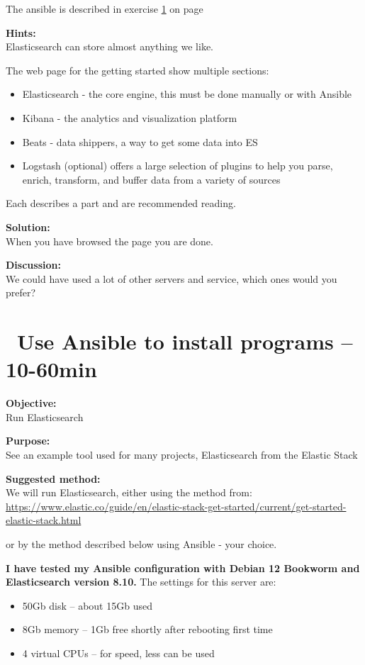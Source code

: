 \documentclass[a4paper,11pt,notitlepage]{report}
\begin{document}
The ansible is described in exercise \ref{ex:basicansible} on page \pageref{ex:basicansible}

{\bf Hints:}\\
Elasticsearch can store almost anything we like.

The web page for the getting started show multiple sections:
\begin{itemize}
\item Elasticsearch - the core engine, this must be done manually or with Ansible
\item Kibana - the analytics and visualization platform
\item Beats - data shippers, a way to get some data into ES
\item Logstash (optional) offers a large selection of plugins to help you parse, enrich, transform, and buffer data from a variety of sources
\end{itemize}

Each describes a part and are recommended reading.


{\bf Solution:}\\
When you have browsed the page you are done.

{\bf Discussion:}\\
We could have used a lot of other servers and service, which ones would you prefer?



\chapter{\faExclamationTriangle\ Use Ansible to install programs -- 10-60min}
\label{ex:basicansible}


{\bf Objective:}\\
Run Elasticsearch

{\bf Purpose:}\\
See an example tool used for many projects, Elasticsearch from the Elastic Stack

{\bf Suggested method:}\\
We will run Elasticsearch, either using the method from:\\{\footnotesize
\url{https://www.elastic.co/guide/en/elastic-stack-get-started/current/get-started-elastic-stack.html}}

or by the method described below using Ansible - your choice.

{\bf I have tested my Ansible configuration with Debian 12 Bookworm and Elasticsearch version 8.10.} The settings for this server are:
\begin{itemize}
\item 50Gb disk -- about 15Gb used
\item 8Gb memory -- 1Gb free shortly after rebooting first time
\item 4 virtual CPUs -- for speed, less can be used
\end{itemize}
\end{document}
